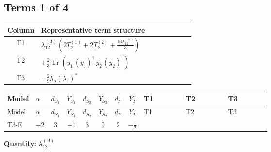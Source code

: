 \documentclass[8pt]{article}
\begin{document}
\begin{landscape}
\subsection*{Terms 1 of 4}
\begin{center}
\begin{tabular}{@{}c >{\raggedright\arraybackslash}p{0.82\linewidth}@{}}
\toprule
Column & Representative term structure \\
\midrule
T1 & \(\displaystyle {\lambda_{12}^{(A)}} \left(2 T_{\nu}^{(1)}+2 T_{\nu}^{(2)}+\frac{16 {\lambda_{12}^{(\times)}}}{3}\right)\) \\
\midrule
T2 & \(\displaystyle +\frac{2}{3} \operatorname{Tr}\!\left({y_1}\,\left({y_1}\right)^{\dagger}\,{y_2}\,\left({y_2}\right)^{\dagger}\right)\) \\
\midrule
T3 & \(\displaystyle -\frac{2}{9} {\lambda_5} \left({\lambda_5}\right)^{*}\) \\
\midrule
\bottomrule
\end{tabular}
\end{center}
\smallskip
\tiny
\begin{longtable}{@{}llcccccc >{\raggedright\arraybackslash}p{0.21\linewidth} >{\raggedright\arraybackslash}p{0.21\linewidth} >{\raggedright\arraybackslash}p{0.21\linewidth}@{}}
\toprule
Model & $\alpha$ & $d_{S_1}$ & $Y_{S_1}$ & $d_{S_2}$ & $Y_{S_2}$ & $d_F$ & $Y_F$ & T1 & T2 & T3 \\
\midrule
\endfirsthead
\toprule
Model & $\alpha$ & $d_{S_1}$ & $Y_{S_1}$ & $d_{S_2}$ & $Y_{S_2}$ & $d_F$ & $Y_F$ & T1 & T2 & T3 \\
\midrule
\endhead
T3-E & $-2$ & $3$ & $-1$ & $3$ & $0$ & $2$ & $-\frac{1}{2}$ & \scriptsize\adjustbox{max width=\linewidth}{$\begin{gathered} {\lambda_{12}^{(A)}} \left(2 T_{\nu}^{(1)}+2 T_{\nu}^{(2)}+\frac{16 {\lambda_{12}^{(\times)}}}{3}\right)\end{gathered}$} & \scriptsize\adjustbox{max width=\linewidth}{$\begin{gathered} +\frac{2}{3} \operatorname{Tr}\!\left({y_1}\,\left({y_1}\right)^{\dagger}\,{y_2}\,\left({y_2}\right)^{\dagger}\right)\end{gathered}$} & \scriptsize\adjustbox{max width=\linewidth}{$\begin{gathered} -\frac{2}{9} {\lambda_5} \left({\lambda_5}\right)^{*}\end{gathered}$} \\
\midrule
\bottomrule
\end{longtable}
\clearpage
\noindent\textbf{Quantity: }$\lambda_{12}^{(A)}$\par\smallskip

\end{landscape}
\end{document}
